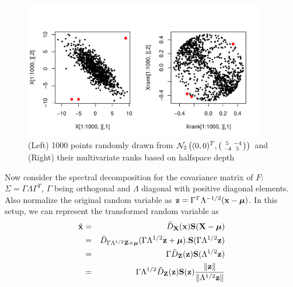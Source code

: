 \documentclass[fleqn,11pt]{article}
\begin{document}
\begin{figure}[t]
	\captionsetup{singlelinecheck=off}
	\centering
		\includegraphics[height=6cm]{ranks}
	\caption{(Left) 1000 points randomly drawn from $\mathcal N_2\left((0,0)^T, \left(\protect\begin{smallmatrix} 5 & -4 \\ -4 & 5 \protect\end{smallmatrix}\right)\right) $ and (Right) their multivariate ranks based on halfspace depth}
	\label{fig:rankplot}
\end{figure}

Now consider the spectral decomposition for the covariance matrix of $F$: $\Sigma = \Gamma\Lambda\Gamma^T$, $\Gamma$ being orthogonal and $\Lambda$ diagonal with positive diagonal elements. Also normalize the original random variable as ${\bf{z}} = \Gamma^T\Lambda^{-1/2} ({\bf{x}} - {\boldsymbol{\mu}})$. In this setup, we can represent the transformed random variable as
%
\begin{eqnarray}
\tilde {{\bf{x}}} &=& \tilde D_{{\mathbf{X}}} ({\bf{x}}) {\mathbf{S}}({\mathbf{X}} - {\boldsymbol{\mu}}) \notag \\
&=& \tilde D_{\Gamma\Lambda^{1/2}{\mathbf{Z}} + {\boldsymbol{\mu}}} (\Gamma\Lambda^{1/2} {\bf{z}} + {\boldsymbol{\mu}}). {\mathbf{S}}(\Gamma\Lambda^{1/2} {\bf{z}}) \notag \\
&=& \Gamma \tilde D_{{\mathbf{Z}}}({\bf{z}}) {\mathbf{S}}(\Lambda^{1/2}{\bf{z}}) \notag \\
&=& \Gamma \Lambda^{1/2} \tilde D_{{\mathbf{Z}}}({\bf{z}}) {\mathbf{S}}({\bf{z}}) \frac{\| {\bf{z}} \|}{\|\Lambda^{1/2} {\bf{z}}\|}
\label{equation:rankdecomp}
\end{eqnarray}
%
\end{document}
